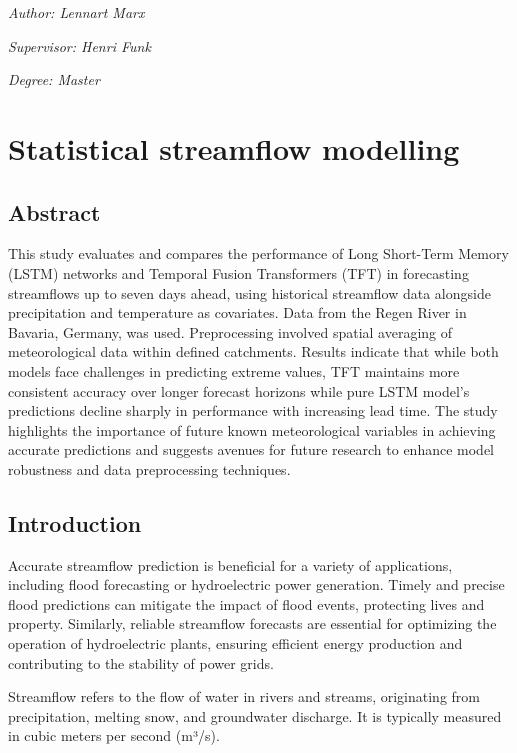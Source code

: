 \documentclass[
]{article}
\author{}
\date{\vspace{-2.5em}}
\begin{document}
\emph{Author: Lennart Marx}

\emph{Supervisor: Henri Funk}

\emph{Degree: Master}

\hypertarget{sm}{%
\section{Statistical streamflow modelling}\label{sm}}

\hypertarget{abstract}{%
\subsection{Abstract}\label{abstract}}

This study evaluates and compares the performance of Long Short-Term
Memory (LSTM) networks and Temporal Fusion Transformers (TFT) in
forecasting streamflows up to seven days ahead, using historical
streamflow data alongside precipitation and temperature as covariates.
Data from the Regen River in Bavaria, Germany, was used. Preprocessing
involved spatial averaging of meteorological data within defined
catchments. Results indicate that while both models face challenges in
predicting extreme values, TFT maintains more consistent accuracy over
longer forecast horizons while pure LSTM model's predictions decline
sharply in performance with increasing lead time. The study highlights
the importance of future known meteorological variables in achieving
accurate predictions and suggests avenues for future research to enhance
model robustness and data preprocessing techniques.

\hypertarget{introduction}{%
\subsection{Introduction}\label{introduction}}

Accurate streamflow prediction is beneficial for a variety of
applications, including flood forecasting or hydroelectric power
generation. Timely and precise flood predictions can mitigate the impact
of flood events, protecting lives and property. Similarly, reliable
streamflow forecasts are essential for optimizing the operation of
hydroelectric plants, ensuring efficient energy production and
contributing to the stability of power grids.

Streamflow refers to the flow of water in rivers and streams,
originating from precipitation, melting snow, and groundwater discharge.
It is typically measured in cubic meters per second (m³/s).
\end{document}
